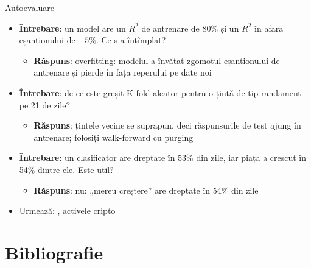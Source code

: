 \begin{frame}{Autoevaluare}
\itemsize{\small}
\begin{itemize}
    \item \textbf{Întrebare}: un model are un $R^2$ de antrenare de 80\% și un $R^2$ în afara eșantionului de $-5\%$. Ce s-a întîmplat?
    \begin{itemize}
        \item \textbf{Răspuns}: overfitting: modelul a învățat zgomotul eșantionului de antrenare și pierde în fața reperului pe date noi
    \end{itemize}
    \item \textbf{Întrebare}: de ce este greșit K-fold aleator pentru o țintă de tip randament pe 21 de zile?
    \begin{itemize}
        \item \textbf{Răspuns}: țintele vecine se suprapun, deci răspunsurile de test ajung în antrenare; folosiți walk-forward cu purging
    \end{itemize}
    \item \textbf{Întrebare}: un clasificator are dreptate în 53\% din zile, iar piața a crescut în 54\% dintre ele. Este util?
    \begin{itemize}
        \item \textbf{Răspuns}: nu: „mereu creștere” are dreptate în 54\% din zile
    \end{itemize}
    \item Urmează: , activele cripto
\end{itemize}
\end{frame}


\section{Bibliografie}

